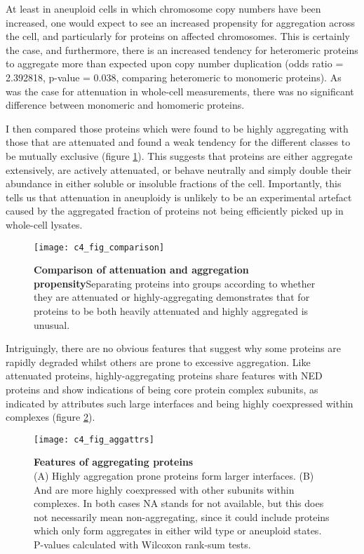 \documentclass[a4paper,11pt,twoside,openright]{scrbook}
\begin{document}
At least in aneuploid cells in which chromosome copy numbers have been increased, one would expect to see an increased propensity for aggregation across the cell, and particularly for proteins on affected chromosomes. This is certainly the case, and furthermore, there is an increased tendency for heteromeric proteins to aggregate more than expected upon copy number duplication (odds ratio = 2.392818, p-value = 0.038, comparing heteromeric to monomeric proteins). As was the case for attenuation in whole-cell measurements, there was no significant difference between monomeric and homomeric proteins.

I then compared those proteins which were found to be highly aggregating with those that are attenuated and found a weak tendency for the different classes to be mutually exclusive (figure \ref{figure:aneuploidy_comparison}). This suggests that proteins are either aggregate extensively, are actively attenuated, or behave neutrally and simply double their abundance in either soluble or insoluble fractions of the cell. Importantly, this tells us that attenuation in aneuploidy is unlikely to be an experimental artefact caused by the aggregated fraction of proteins not being efficiently picked up in whole-cell lysates.

\begin{figure}[h]
\fcapsideright
    {\caption[Comparison of attenuation and aggregation propensity]{\sffamily\textbf{Comparison of attenuation and aggregation propensity}\newline \small Separating proteins into groups according to whether they are attenuated or highly-aggregating demonstrates that for proteins to be both heavily attenuated and highly aggregated is unusual.}\label{figure:aneuploidy_comparison}}
    {\texttt{[image: c4\_fig\_comparison]}}
\end{figure}

Intriguingly, there are no obvious features that suggest why some proteins are rapidly degraded whilst others are prone to excessive aggregation. Like attenuated proteins, highly-aggregating proteins share features with NED proteins and show indications of being core protein complex subunits, as indicated by attributes such large interfaces and being highly coexpressed within complexes (figure \ref{figure:aneuploidy_aggattrs}).

\begin{figure}[h]
    \texttt{[image: c4\_fig\_aggattrs]}
    \caption[Features of aggregating proteins]{\sffamily \textbf{Features of aggregating proteins} \\ \small (A) Highly aggregation prone proteins form larger interfaces. (B) And are more highly coexpressed with other subunits within complexes. In both cases NA stands for not available, but this does not necessarily mean non-aggregating, since it could include proteins which only form aggregates in either wild type or aneuploid states. P-values calculated with Wilcoxon rank-sum tests.}
    \label{figure:aneuploidy_aggattrs}
\end{figure}
\end{document}
